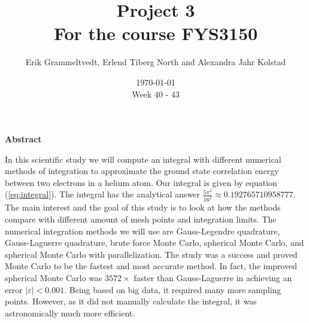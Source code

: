 \documentclass{article}
\begin{document}
\addtocounter{page}{0}

\title{Project 3 \\
      \large For the course FYS3150}
\date{\today \\
    \vspace{1mm}
    \large Week 40 - 43}

\author{Erik Grammeltvedt, Erlend Tiberg North and Alexandra Jahr Kolstad}

\maketitle





\vspace{1cm}


\begin{center}

{\Large\textbf{Abstract}} \label{sec:Abstract}

\end{center}


In this scientific study we will compute an integral with different numerical methods of integration to approximate the ground state correlation energy between two electrons in a helium atom. Our integral is given by equation (\ref{eq:integral}). The integral has the analytical answer $\frac{5 \pi^2}{16^2} \approx 0.192765710958777$. The main interest and the goal of this study is to look at how the methods compare with different amount of mesh points and integration limits. The numerical integration methods we will use are Gauss-Legendre quadrature, Gauss-Laguerre quadrature, brute force Monte Carlo, spherical Monte Carlo, and spherical Monte Carlo with parallelization. The study was a success and proved Monte Carlo to be the fastest and most accurate method. In fact, the improved spherical Monte Carlo was $3572\times$ faster than Gauss-Laguerre in achieving an error $|\varepsilon|<0.001$. Being based on big data, it required many more sampling points. However, as it did not manually calculate the integral, it was astronomically much more efficient. \\


\newpage

\end{document}
